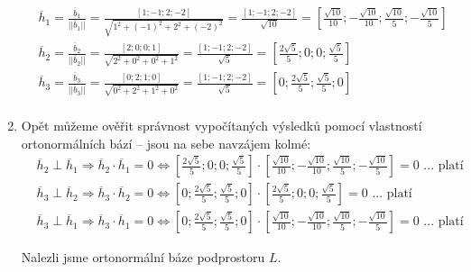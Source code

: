 \documentclass[12pt,a4paper]{article}
\begin{document}
\begin{enumerate}
    \begin{align*}
        &\overline{h}_1 = \frac{\overline{b}_1}{||\overline{b}_1||} = \frac{[1;-1;2;-2]}{\sqrt{1^2 + (-1)^2 + 2^2 + (-2)^2}} = \frac{[1;-1;2;-2]}{\sqrt{10}} = \left[\displaystyle \frac{\sqrt{10}}{10}; - \frac{\sqrt{10}}{10}; \frac{\sqrt{10}}{5}; - \frac{\sqrt{10}}{5} \right ] \\
        &\overline{h}_2 = \frac{\overline{b}_2}{||\overline{b}_2||} = \frac{[2;0;0;1]}{\sqrt{2^2 + 0^2 + 0^2 + 1^2}} = \frac{[1;-1;2;-2]}{\sqrt{5}} = \left[\displaystyle \frac{2\sqrt{5}}{5}; 0; 0; \frac{\sqrt{5}}{5} \right ] \\
        &\overline{h}_3 = \frac{\overline{b}_3}{||\overline{b}_3||} = \frac{[0;2;1;0]}{\sqrt{0^2 + 2^2 + 1^2 + 0^2}} = \frac{[1;-1;2;-2]}{\sqrt{5}} = \left[\displaystyle 0; \frac{2\sqrt{5}}{5}; \frac{\sqrt{5}}{5}; 0 \right ] \\
    \end{align*}
    \item Opět můžeme ověřit správnost vypočítaných výsledků pomocí vlastností ortonormálních bází – jsou na sebe navzájem kolmé:
    \begin{align*}
        &\overline{h}_2 \perp \overline{h}_1 \Rightarrow \overline{h}_2 \cdot \overline{h}_1 = 0 \Leftrightarrow \left[\displaystyle \frac{2\sqrt{5}}{5}; 0; 0; \frac{\sqrt{5}}{5} \right ] \cdot \left[\displaystyle \frac{\sqrt{10}}{10}; - \frac{\sqrt{10}}{10}; \frac{\sqrt{10}}{5}; - \frac{\sqrt{10}}{5} \right ] = 0 \text{ ... platí} \\
        &\overline{h}_3 \perp \overline{h}_2 \Rightarrow \overline{h}_3 \cdot \overline{h}_2 = 0 \Leftrightarrow \left[\displaystyle 0; \frac{2\sqrt{5}}{5}; \frac{\sqrt{5}}{5}; 0 \right ] \cdot \left[\displaystyle \frac{2\sqrt{5}}{5}; 0; 0; \frac{\sqrt{5}}{5} \right ] = 0 \text{ ... platí} \\
        &\overline{h}_3 \perp \overline{h}_1 \Rightarrow \overline{h}_3 \cdot \overline{h}_1 = 0 \Leftrightarrow \left[\displaystyle 0; \frac{2\sqrt{5}}{5}; \frac{\sqrt{5}}{5}; 0 \right ] \cdot \left[\displaystyle \frac{\sqrt{10}}{10}; - \frac{\sqrt{10}}{10}; \frac{\sqrt{10}}{5}; - \frac{\sqrt{10}}{5} \right ] = 0 \text{ ... platí}
    \end{align*}
    
    Nalezli jsme ortonormální báze podprostoru $L$.
\end{enumerate}


\end{document}
